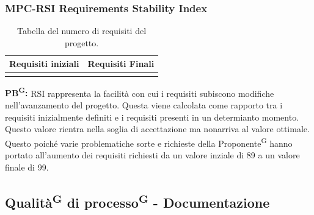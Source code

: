 \documentclass[8pt]{article}
\newcommand{\glossterm}[1]{#1\textsuperscript{G}} %
\begin{document}
\subsubsection{MPC-RSI Requirements Stability Index}
\renewcommand{\arraystretch}{2.5}
\begin{longtable}{|>{\centering}p{3cm}|>{\centering\arraybackslash}p{3cm}|}
    \hline
    \rowcolor{white}
    \textbf{Requisiti iniziali} & \textbf{Requisiti Finali} \\
    \hline
    \endfirsthead 
    \rowcolor{white}
    \caption{Tabella del numero di requisiti del progetto.} 
    \label{table:Tabella del numero di requisiti del progetto}
    \endlastfoot 
    89 & 99 \\
    \hline
\end{longtable}
\textbf{\glossterm{PB}:} RSI rappresenta la facilità con cui i requisiti subiscono modifiche nell'avanzamento del progetto. Questa viene calcolata come rapporto tra i requisiti inizialmente definiti e i requisiti presenti in un determianto momento. Questo valore rientra nella soglia di accettazione ma nonarriva al valore ottimale. Questo poiché varie problematiche sorte e richieste della \glossterm{Proponente} hanno portato all'aumento dei requisiti richiesti da un valore inziale di 89 a un valore finale di 99.
\clearpage
\subsection{\glossterm{Qualità} di \glossterm{processo} - Documentazione}
\end{document}
